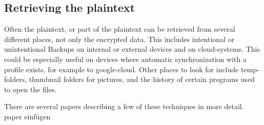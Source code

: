 \subsection{Retrieving the plaintext}
Often the plaintext, or part of the plaintext can be retrieved from several different places, not only the encrypted data. This includes intentional or unintentional Backups on internal or external devices and on cloud-systems.  This could be especially useful on devices where automatic synchronization with a profile exists, for example to google-cloud. Other places to look for include temp-folders, thumbnail folders for pictures, and the history of certain programs used to open the files.

There are several papers describing a few of these techniques in more detail.
\\paper einfügen
